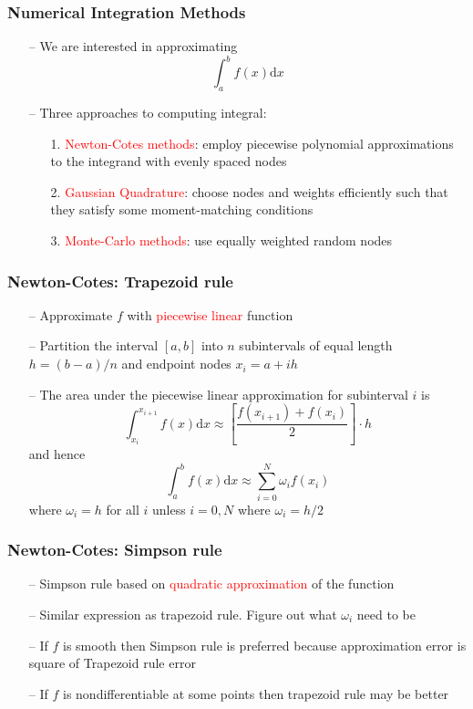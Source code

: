 \documentclass[aspectratio=169, 11pt]{beamer}
\begin{document}
\begin{frame}
\frametitle{Numerical Integration Methods}
  \begin{itemize}
    \item[--] We are interested in approximating
    \[
      \int_{a}^{b}f\left(x\right)\mathrm{d}x
    \]
    \bigskip
    \item[--] Three approaches to computing integral:
    \begin{itemize}
      \medskip
      \item[1.] \textcolor{red}{Newton-Cotes methods}: employ piecewise polynomial approximations to the integrand with evenly spaced nodes
      \medskip
      \item[2.] \textcolor{red}{Gaussian Quadrature}: choose nodes and weights efficiently such that they satisfy some moment-matching conditions
      \medskip
      \item[3.] \textcolor{red}{Monte-Carlo methods}: use equally weighted random nodes
    \end{itemize}
  \end{itemize}
\end{frame}

\begin{frame}
\frametitle{Newton-Cotes: Trapezoid rule}
  \begin{itemize}
    \item[--] Approximate $f$ with \textcolor{red}{piecewise linear} function
    \bigskip
    \item[--] Partition the interval $[a,b]$ into $n$ subintervals of equal length $h=(b-a)/n$ and endpoint nodes $x_{i}=a+ih$
    \bigskip
    \item[--] The area under the piecewise linear approximation for subinterval $i$ is
    \[
      \int_{x_{i}}^{x_{i+1}}f\left(x\right)\mathrm{d}x\approx\left[\frac{f\left(x_{i+1}\right)+f\left(x_{i}\right)}{2}\right]\cdot h
    \]
    and hence
    \[
      \int_{a}^{b}f\left(x\right)\mathrm{d}x\approx\sum_{i=0}^{N}\omega_{i}f\left(x_{i}\right)
    \]
    where $\omega_{i}=h$ for all $i$ unless $i=0,N$ where $\omega_{i}=h/2$
  \end{itemize}
\end{frame}

\begin{frame}
\frametitle{Newton-Cotes: Simpson rule}
  \begin{itemize}
    \item[--] Simpson rule based on \textcolor{red}{quadratic approximation} of the function
    \bigskip
    \item[--] Similar expression as trapezoid rule. Figure out what $\omega_{i}$ need to be
    \bigskip
    \item[--] If $f$ is smooth then Simpson rule is preferred because approximation error is square of Trapezoid rule error
    \bigskip
    \item[--] If $f$ is nondifferentiable at some points then trapezoid rule may be better
  \end{itemize}
\end{frame}
\end{document}

